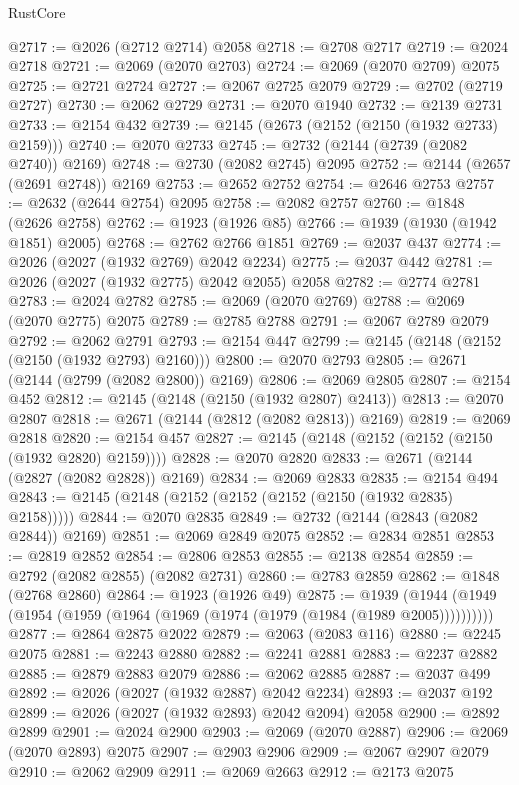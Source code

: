 \begin{lexlean}{RustCore}
\begin{coremodule}
@2717 := @2026 (@2712 @2714) @2058
@2718 := @2708 @2717
@2719 := @2024 @2718
@2721 := @2069 (@2070 @2703)
@2724 := @2069 (@2070 @2709) @2075
@2725 := @2721 @2724
@2727 := @2067 @2725 @2079
@2729 := @2702 (@2719 @2727)
@2730 := @2062 @2729
@2731 := @2070 @1940
@2732 := @2139 @2731
@2733 := @2154 @432
@2739 := @2145 (@2673 (@2152 (@2150 (@1932 @2733) @2159)))
@2740 := @2070 @2733
@2745 := @2732 (@2144 (@2739 (@2082 @2740)) @2169)
@2748 := @2730 (@2082 @2745) @2095
@2752 := @2144 (@2657 (@2691 @2748)) @2169
@2753 := @2652 @2752
@2754 := @2646 @2753
@2757 := @2632 (@2644 @2754) @2095
@2758 := @2082 @2757
@2760 := @1848 (@2626 @2758)
@2762 := @1923 (@1926 @85)
@2766 := @1939 (@1930 (@1942 @1851) @2005)
@2768 := @2762 @2766 @1851
@2769 := @2037 @437
@2774 := @2026 (@2027 (@1932 @2769) @2042 @2234)
@2775 := @2037 @442
@2781 := @2026 (@2027 (@1932 @2775) @2042 @2055) @2058
@2782 := @2774 @2781
@2783 := @2024 @2782
@2785 := @2069 (@2070 @2769)
@2788 := @2069 (@2070 @2775) @2075
@2789 := @2785 @2788
@2791 := @2067 @2789 @2079
@2792 := @2062 @2791
@2793 := @2154 @447
@2799 := @2145 (@2148 (@2152 (@2150 (@1932 @2793) @2160)))
@2800 := @2070 @2793
@2805 := @2671 (@2144 (@2799 (@2082 @2800)) @2169)
@2806 := @2069 @2805
@2807 := @2154 @452
@2812 := @2145 (@2148 (@2150 (@1932 @2807) @2413))
@2813 := @2070 @2807
@2818 := @2671 (@2144 (@2812 (@2082 @2813)) @2169)
@2819 := @2069 @2818
@2820 := @2154 @457
@2827 := @2145 (@2148 (@2152 (@2152 (@2150 (@1932 @2820) @2159))))
@2828 := @2070 @2820
@2833 := @2671 (@2144 (@2827 (@2082 @2828)) @2169)
@2834 := @2069 @2833
@2835 := @2154 @494
@2843 := @2145 (@2148 (@2152 (@2152 (@2152 (@2150 (@1932 @2835) @2158)))))
@2844 := @2070 @2835
@2849 := @2732 (@2144 (@2843 (@2082 @2844)) @2169)
@2851 := @2069 @2849 @2075
@2852 := @2834 @2851
@2853 := @2819 @2852
@2854 := @2806 @2853
@2855 := @2138 @2854
@2859 := @2792 (@2082 @2855) (@2082 @2731)
@2860 := @2783 @2859
@2862 := @1848 (@2768 @2860)
@2864 := @1923 (@1926 @49)
@2875 := @1939 (@1944 (@1949 (@1954 (@1959 (@1964 (@1969 (@1974 (@1979 (@1984 (@1989 @2005))))))))))
@2877 := @2864 @2875 @2022
@2879 := @2063 (@2083 @116)
@2880 := @2245 @2075
@2881 := @2243 @2880
@2882 := @2241 @2881
@2883 := @2237 @2882
@2885 := @2879 @2883 @2079
@2886 := @2062 @2885
@2887 := @2037 @499
@2892 := @2026 (@2027 (@1932 @2887) @2042 @2234)
@2893 := @2037 @192
@2899 := @2026 (@2027 (@1932 @2893) @2042 @2094) @2058
@2900 := @2892 @2899
@2901 := @2024 @2900
@2903 := @2069 (@2070 @2887)
@2906 := @2069 (@2070 @2893) @2075
@2907 := @2903 @2906
@2909 := @2067 @2907 @2079
@2910 := @2062 @2909
@2911 := @2069 @2663
@2912 := @2173 @2075

\end{coremodule}
\end{lexlean}
